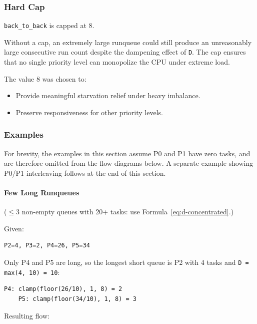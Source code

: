 \documentclass[11pt]{article}
\begin{document}
\subsubsection{Hard Cap}

\texttt{back\_to\_back} is capped at 8.

Without a cap, an extremely large runqueue could still produce an unreasonably large consecutive run count despite the dampening effect of \texttt{D}.
The cap ensures that no single priority level can monopolize the CPU under extreme load.

The value 8 was chosen to:

\begin{itemize}
	\item Provide meaningful starvation relief under heavy imbalance.
	\item Preserve responsiveness for other priority levels.
\end{itemize}

\subsubsection{Examples}

\begin{specnote}
	For brevity, the examples in this section assume P0 and P1 have zero tasks, and are therefore omitted from the flow diagrams below.
	A separate example showing P0/P1 interleaving follows at the end of this section.
\end{specnote}

\paragraph{Few Long Runqueues}

(\(\leq\)3 non-empty queues with 20+ tasks: use Formula~\ref{eq:d-concentrated}.)

Given:

\begin{Verbatim}[fontsize=\small]
	P2=4, P3=2, P4=26, P5=34
\end{Verbatim}

Only P4 and P5 are long, so the longest short queue is P2 with 4 tasks and \texttt{D = max(4, 10) = 10}:

\begin{Verbatim}[fontsize=\small]
	P4: clamp(floor(26/10), 1, 8) = 2
	P5: clamp(floor(34/10), 1, 8) = 3
\end{Verbatim}

Resulting flow:
\end{document}
